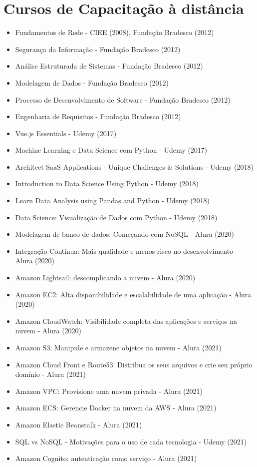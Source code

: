 \section{Cursos de Capacitação à distância}
\begin{itemize}
    \item Fundamentos de Rede - CIEE (2008), Fundação Bradesco (2012)
    \item Segurança da Informação - Fundação Bradesco (2012)
    \item Análise Estruturada de Sistemas - Fundação Bradesco (2012)
    \item Modelagem de Dados - Fundação Bradesco (2012)
    \item Processo de Desenvolvimento de Software - Fundação Bradesco (2012)
    \item Engenharia de Requisitos - Fundação Bradesco (2012)
    \item Vue.js Essentials - Udemy (2017)
    \item Machine Learning e Data Science com Python - Udemy (2017)
    \item Architect SaaS Applications - Unique Challenges & Solutions - Udemy (2018)
    \item Introduction to Data Science Using Python - Udemy (2018)
    \item Learn Data Analysis using Pandas and Python - Udemy (2018)
    \item Data Science: Visualização de Dados com Python - Udemy (2018)
    \item Modelagem de banco de dados: Começando com NoSQL - Alura (2020)
    \item Integração Contínua: Mais qualidade e menos risco no desenvolvimento - Alura (2020)
    \item Amazon Lightsail: descomplicando a nuvem - Alura (2020)
    \item Amazon EC2: Alta disponibilidade e escalabilidade de uma aplicação - Alura (2020)
    \item Amazon CloudWatch: Visibilidade completa das aplicações e serviços na nuvem - Alura (2020)
    \item Amazon S3: Manipule e armazene objetos na nuvem - Alura (2021)
    \item Amazon Cloud Front e Route53: Distribua os seus arquivos e crie seu próprio domínio - Alura (2021)
    \item Amazon VPC: Provisione uma nuvem privada - Alura (2021)
    \item Amazon ECS: Gerencie Docker na nuvem da AWS - Alura (2021)
    \item Amazon Elastic Beanstalk - Alura (2021)
    \item SQL vs NoSQL - Motivações para o uso de cada tecnologia - Udemy (2021)
    \item Amazon Cognito: autenticação como serviço - Alura (2021)
\end{itemize}

